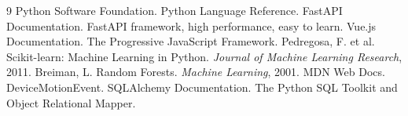 \documentclass[UTF8,a4paper,fontset=fandol]{ctexart}
\begin{document}
\begin{thebibliography}{9}
   Python Software Foundation. Python Language Reference.
   FastAPI Documentation. FastAPI framework, high performance, easy to learn.
   Vue.js Documentation. The Progressive JavaScript Framework.
   Pedregosa, F. et al. Scikit-learn: Machine Learning in Python. \textit{Journal of Machine Learning Research}, 2011.
   Breiman, L. Random Forests. \textit{Machine Learning}, 2001.
   MDN Web Docs. DeviceMotionEvent.
   SQLAlchemy Documentation. The Python SQL Toolkit and Object Relational Mapper.
\end{thebibliography}
\end{document}
